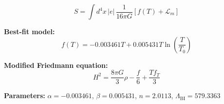 
\begin{equation}
  S = \int d^4x \, |e| \, \frac{1}{16\pi G} \left[ f(T) + \mathcal{L}_m \right]
\end{equation}

\textbf{Best-fit model:}
\begin{equation}
  f(T) = -0.003461 T + 0.005431 T \ln\!\left(\frac{T}{T_0}\right)
\end{equation}

\textbf{Modified Friedmann equation:}
\begin{equation}
  H^2 = \frac{8\pi G}{3} \rho - \frac{f}{6} + \frac{T f_T}{3}
\end{equation}

\textbf{Parameters:}
$\alpha = -0.003461$, \quad
$\beta = 0.005431$, \quad
$n = 2.0113$, \quad
$\Lambda_{\text{BI}} = 579.3363$